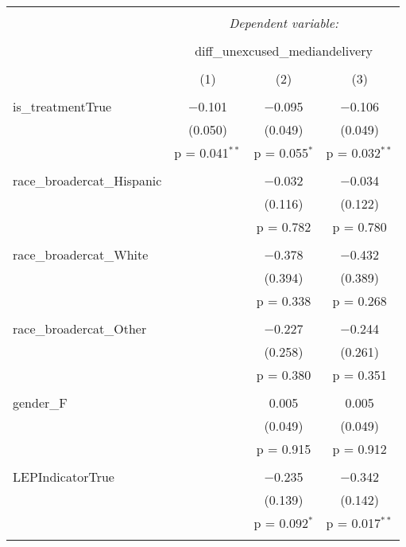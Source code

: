 
\begin{table}[!htbp] \centering 
  \caption{} 
  \label{} 
\begin{tabular}{@{\extracolsep{5pt}}lccc} 
\\[-1.8ex]\hline 
\hline \\[-1.8ex] 
 & \multicolumn{3}{c}{\textit{Dependent variable:}} \\ 
\cline{2-4} 
\\[-1.8ex] & \multicolumn{3}{c}{diff\_unexcused\_mediandelivery} \\ 
\\[-1.8ex] & (1) & (2) & (3)\\ 
\hline \\[-1.8ex] 
 is\_treatmentTrue & $-$0.101 & $-$0.095 & $-$0.106 \\ 
  & (0.050) & (0.049) & (0.049) \\ 
  & p = 0.041$^{**}$ & p = 0.055$^{*}$ & p = 0.032$^{**}$ \\ 
  & & & \\ 
 race\_broadercat\_Hispanic &  & $-$0.032 & $-$0.034 \\ 
  &  & (0.116) & (0.122) \\ 
  &  & p = 0.782 & p = 0.780 \\ 
  & & & \\ 
 race\_broadercat\_White &  & $-$0.378 & $-$0.432 \\ 
  &  & (0.394) & (0.389) \\ 
  &  & p = 0.338 & p = 0.268 \\ 
  & & & \\ 
 race\_broadercat\_Other &  & $-$0.227 & $-$0.244 \\ 
  &  & (0.258) & (0.261) \\ 
  &  & p = 0.380 & p = 0.351 \\ 
  & & & \\ 
 gender\_F &  & 0.005 & 0.005 \\ 
  &  & (0.049) & (0.049) \\ 
  &  & p = 0.915 & p = 0.912 \\ 
  & & & \\ 
 LEPIndicatorTrue &  & $-$0.235 & $-$0.342 \\ 
  &  & (0.139) & (0.142) \\ 
  &  & p = 0.092$^{*}$ & p = 0.017$^{**}$ \\ 
  & & & \\ 

\end{tabular}
\end{table}
